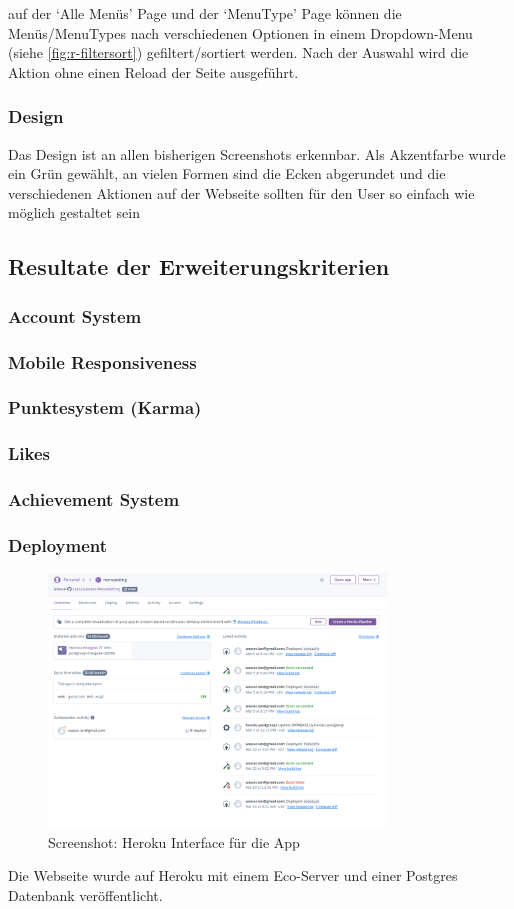 auf der `Alle Menüs' Page und der `MenuType' Page können die Menüs/MenuTypes
nach verschiedenen Optionen in einem Dropdown-Menu (siehe
\ref{fig:r-filtersort}) gefiltert/sortiert werden. Nach der Auswahl wird die
Aktion ohne einen Reload der Seite ausgeführt.

\subsubsection*{Design}
Das Design ist an allen bisherigen Screenshots erkennbar. Als Akzentfarbe wurde
ein Grün gewählt, an vielen Formen sind die Ecken abgerundet und die
verschiedenen Aktionen auf der Webseite sollten für den User so einfach wie
möglich gestaltet sein



\subsection{Resultate der Erweiterungskriterien}

\subsubsection*{Account System}
\subsubsection*{Mobile Responsiveness}
\subsubsection*{Punktesystem (Karma)}
\subsubsection*{Likes}
\subsubsection*{Achievement System}
\subsubsection*{Deployment}

\begin{figure}[ht]
    \centering
    \includegraphics[width=0.8\textwidth]{images/Heroku.png}
    \caption{Screenshot: Heroku Interface für die App}
    \label{fig:r-deployment}
\end{figure}

Die Webseite wurde auf Heroku mit einem Eco-Server und einer Postgres Datenbank
veröffentlicht.




